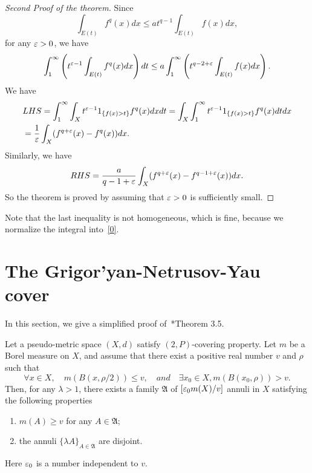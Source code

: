 \begin{proof}[Second Proof of the theorem] Since
\[
\int_{E(t)}f^q(x)dx\leq at^{q-1}\int_{E(t)} f(x) dx,
\]
for any $\varepsilon>0$, we have
\[
\int_1^\infty\left(t^{\varepsilon-1}\int_{E(t)}f^q(x)dx\right) dt\leq a \int_1^\infty\left(t^{q-2+\varepsilon}\int_{E(t)} f(x) dx
\right).
\]
We have
\[
\begin{split}
&
LHS=\int_1^\infty\int_X t^{\varepsilon-1}1_{\{f(x)>t\}}f^q(x) dxdt
=\int_X\int_1^\infty t^{\varepsilon-1}1_{\{f(x)>t\}}f^q(x) dtdx\\
&=\frac{1}{\varepsilon}\int_X (f^{q+\varepsilon}(x)-f^q(x))dx.
\end{split}
\]
Similarly, we have
\[
RHS=\frac{a}{q-1+\varepsilon}\int_X(f^{q+\varepsilon}(x)-f^{q-1+\varepsilon}(x))dx.
\]
So the theorem is proved by assuming that $\varepsilon>0$ is sufficiently small.
\end{proof}

\begin{remark} Note that the last inequality is not homogeneous, which is fine, because we normalize the integral into~\eqref{0}.
\end{remark}




 
 \section{The Grigor'yan-Netrusov-Yau cover}
In this section, we give a simplified proof of~\cite{GNY}*{Theorem 3.5}. 

\begin{theorem}
Let a pseudo-metric space $(X,d)$ satisfy $(2,P)$-covering property. Let $m$ be a Borel measure on $X$, and assume that there exist a positive real number $v$ and $\rho$ such that 
\begin{equation}\label{1}
\forall x\in X,\quad m(B(x,\rho/2))\leq v,\quad and\quad \exists x_0\in X, m(B(x_0,\rho))>v.
\end{equation}
Then, for any $\lambda>1$, there exists a family $\mathfrak A$ of $[\varepsilon_0m(X)/v]$ annuli 
in $X$ satisfying the following properties
\begin{enumerate}
\item $m(A)\geq v$ for any $A\in\mathfrak A$;
\item the annuli $\{\lambda A\}_{A\in\mathfrak A}$ are disjoint. 
\end{enumerate}
Here $\varepsilon_0$ is a number independent to $v$.
\end{theorem}






